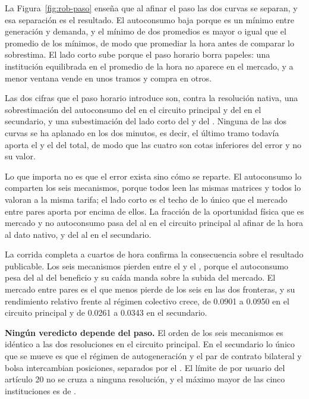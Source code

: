 La Figura~\ref{fig:rob-paso} enseña que al afinar el paso las dos curvas se
separan, y esa separación es el resultado. El autoconsumo baja porque es un
mínimo entre generación y demanda, y el mínimo de dos promedios es mayor o
igual que el promedio de los mínimos, de modo que promediar la hora antes
de comparar lo sobrestima. El lado corto sube porque el paso horario borra
papeles: una institución equilibrada en el promedio de la hora no aparece
en el mercado, y a menor ventana vende en unos tramos y compra en otros.

Las dos cifras que el paso horario introduce son, contra la resolución
nativa, una sobrestimación del autoconsumo del  en el circuito
principal y del  en el secundario, y una subestimación del lado
corto del  y del . Ninguna de las dos curvas se ha
aplanado en los dos minutos, es decir, el último tramo todavía aporta el
 y el  del total, de modo que las cuatro son cotas
inferiores del error y no su valor.

Lo que importa no es que el error exista sino cómo se reparte. El
autoconsumo lo comparten los seis mecanismos, porque todos leen las mismas
matrices y todos lo valoran a la misma tarifa; el lado corto es el techo de
lo único que el mercado entre pares aporta por encima de ellos. La fracción
de la oportunidad física que es mercado y no autoconsumo pasa del
 al  en el circuito principal al afinar de la hora al
dato nativo, y del  al  en el secundario.

La corrida completa a cuartos de hora confirma la consecuencia sobre el
resultado publicable. Los seis mecanismos pierden entre el  y el
, porque el autoconsumo pesa del  al  del
beneficio y su caída manda sobre la subida del mercado. El mercado entre
pares es el que menos pierde de los seis en las dos fronteras, y su
rendimiento relativo frente al régimen colectivo crece, de \num{0.0901} a
\num{0.0950} en el circuito principal y de \num{0.0261} a \num{0.0343} en
el secundario.

\begin{lecturabox}
\textbf{Ningún veredicto depende del paso.} El orden de los seis mecanismos
es idéntico a las dos resoluciones en el circuito principal. En el
secundario lo único que se mueve es que el régimen de autogeneración y el
par de contrato bilateral y bolsa intercambian posiciones, separados por el
. El límite de  por usuario del artículo 20 no se
cruza a ninguna resolución, y el máximo mayor de las cinco instituciones es
de .
\end{lecturabox}

